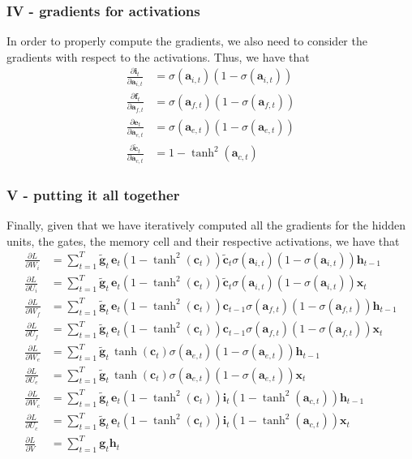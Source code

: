 \documentclass{article}
\begin{document}
\subsubsection*{IV - gradients for activations}
	In order to properly compute the gradients, we also need to consider the gradients with respect to the activations. Thus, we have that
	\begin{align*}
		\frac{\partial \bm{i}_{t}}{\partial \bm{a}_{i, t}} &= \sigma(\bm{a}_{i, t})(1 - \sigma(\bm{a}_{i, t}))\\
		\frac{\partial \bm{f}_{t}}{\partial \bm{a}_{f, t}} &= \sigma(\bm{a}_{f, t})(1 - \sigma(\bm{a}_{f, t}))\\
		\frac{\partial \bm{e}_{t}}{\partial \bm{a}_{e, t}} &= \sigma(\bm{a}_{e, t})(1 - \sigma(\bm{a}_{e, t}))\\
		\frac{\partial \tilde{\bm{c}}_{t}}{\partial \bm{a}_{c, t}} &= 1 - \tanh^2(\bm{a}_{c, t})
	\end{align*}

\subsubsection*{V - putting it all together}
	Finally, given that we have iteratively computed all the gradients for the hidden units, the gates, the memory cell and their respective activations, we have that
	\begin{align}
		 \frac{\partial L}{\partial W_i} &= \sum_{t=1}^T \tilde{\bm{g}}_t\, \bm{e}_t (1 - \tanh^2(\bm{c}_t)) \tilde{\bm{c}}_t \sigma(\bm{a}_{i, t})(1 - \sigma(\bm{a}_{i, t})) \bm{h}_{t-1} \\
		 \frac{\partial L}{\partial U_i} &= \sum_{t=1}^T \tilde{\bm{g}}_t\, \bm{e}_t (1 - \tanh^2(\bm{c}_t)) \tilde{\bm{c}}_t \sigma(\bm{a}_{i, t})(1 - \sigma(\bm{a}_{i, t})) \bm{x}_{t} \\
		\frac{\partial L}{\partial W_f} &= \sum_{t=1}^T \tilde{\bm{g}}_t\,\bm{e}_t (1 - \tanh^2(\bm{c}_t)) \bm{c}_{t-1} \sigma(\bm{a}_{f, t})(1 - \sigma(\bm{a}_{f, t})) \bm{h}_{t-1} \\ 
		\frac{\partial L}{\partial U_f} &= \sum_{t=1}^T \tilde{\bm{g}}_t\,\bm{e}_t (1 - \tanh^2(\bm{c}_t)) \bm{c}_{t-1} \sigma(\bm{a}_{f, t})(1 - \sigma(\bm{a}_{f, t})) \bm{x}_{t} \\ 
		\frac{\partial L}{\partial W_e} &= \sum_{t=1}^T \tilde{\bm{g}}_t\,  \tanh(\bm{c}_t) \sigma(\bm{a}_{e, t})(1 - \sigma(\bm{a}_{e, t})) \bm{h}_{t-1} \\
		\frac{\partial L}{\partial U_e} &= \sum_{t=1}^T \tilde{\bm{g}}_t\,  \tanh(\bm{c}_t) \sigma(\bm{a}_{e, t})(1 - \sigma(\bm{a}_{e, t})) \bm{x}_{t} \\
		\frac{\partial L}{\partial W_c} &= \sum_{t=1}^T \tilde{\bm{g}}_t\, \bm{e}_t (1 - \tanh^2(\bm{c}_t)) \bm{i}_t (1 - \tanh^2(\bm{a}_{c, t})) \bm{h}_{t-1} \\
		\frac{\partial L}{\partial U_c} &= \sum_{t=1}^T \tilde{\bm{g}}_t\, \bm{e}_t (1 - \tanh^2(\bm{c}_t)) \bm{i}_t (1 - \tanh^2(\bm{a}_{c, t})) \bm{x}_{t} \\
		\frac{\partial L}{\partial V} &= \sum_{t=1}^T \bm{g}_t\bm{h}_t
	\end{align}
\end{document}
